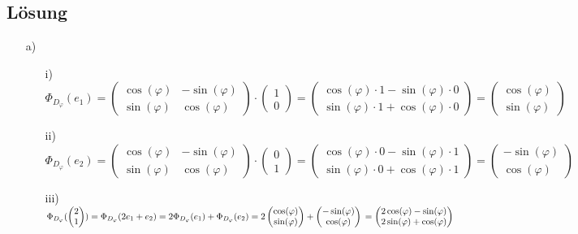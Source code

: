 \subsection*{L\"osung}
\begin{itemize}
\item[a)]
\begin{itemize}
\item[i)] $\Phi_{D_\varphi}(e_1)=\begin{pmatrix}
		\cos(\varphi)	&-\sin(\varphi)	\\
		\sin(\varphi)	&\cos(\varphi)
	\end{pmatrix} \cdot \begin{pmatrix} 1\\0\end{pmatrix}=\begin{pmatrix} \cos(\varphi)\cdot1 - \sin(\varphi) \cdot 0 \\\sin(\varphi)\cdot1  +\cos(\varphi) \cdot0\end{pmatrix} =\begin{pmatrix} \cos(\varphi)\\\sin(\varphi)\end{pmatrix}$
\item[ii)] $\Phi_{D_\varphi}(e_2)=\begin{pmatrix}
		\cos(\varphi)	&-\sin(\varphi)	\\
		\sin(\varphi)	&\cos(\varphi)
	\end{pmatrix} \cdot \begin{pmatrix} 0\\1\end{pmatrix}=\begin{pmatrix} \cos(\varphi)\cdot0 - \sin(\varphi) \cdot 1 \\\sin(\varphi)\cdot0  +\cos(\varphi) \cdot1\end{pmatrix} =\begin{pmatrix} -\sin(\varphi)\\\cos(\varphi)\end{pmatrix}$
\item[iii)] $\Phi_{D_\varphi}(\begin{pmatrix} 2 \\ 1 \end{pmatrix})=\Phi_{D_\varphi}(2e_1+e_2)=2\Phi_{D_\varphi}(e_1)+\Phi_{D_\varphi}(e_2)=2\begin{pmatrix} \cos(\varphi)\\\sin(\varphi)\end{pmatrix}+\begin{pmatrix} -\sin(\varphi)\\\cos(\varphi)\end{pmatrix}\\ =\begin{pmatrix} 2\cos(\varphi)-\sin(\varphi)\\2\sin(\varphi)+\cos(\varphi)\end{pmatrix}$

\end{itemize}
\end{itemize}
